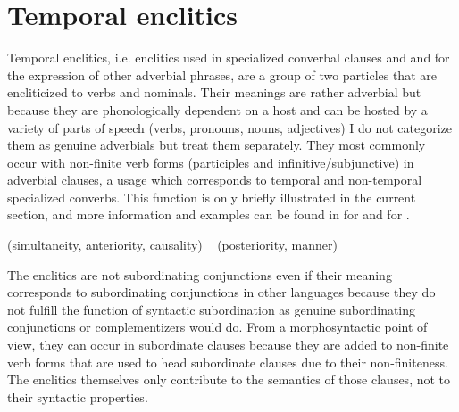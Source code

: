 \section{Temporal enclitics}
\label{sec:Temporal enclitics}

Temporal enclitics, i.e. enclitics used in specialized converbal clauses and and for the expression of other adverbial phrases, are a group of two particles that are encliticized to verbs and nominals. Their meanings are rather adverbial  but because they are phonologically dependent on a host and can be hosted by a variety of parts of speech (verbs, pronouns, nouns, adjectives) I do not categorize them as genuine adverbials but treat them separately. They most commonly occur with non-finite verb forms (participles and infinitive/subjunctive) in adverbial clauses, a usage which corresponds to temporal and non-temporal specialized converbs. This function is only briefly illustrated in the current section, and more information and examples can be found in  for  and  for . 


\begin{exe}
	\ex	\label{ex:subordinating enclitics}
	\begin{xlist}
		\TabPositions{14em}
		\ex	{} 	\tab	(simultaneity, anteriority, causality)	   
		\ex	{} 
		\sn	~\hspace*{1em}					\tab	(posteriority, manner)	      
	\end{xlist}
\end{exe}

The enclitics are not subordinating conjunctions even if their meaning corresponds to subordinating conjunctions in other languages because they do not fulfill the function of syntactic subordination as genuine subordinating conjunctions or complementizers would do. From a morphosyntactic point of view, they can occur in subordinate clauses because they are added to non-finite verb forms that are used to head subordinate clauses due to their non-finiteness. The enclitics themselves only contribute to the semantics of those clauses, not to their syntactic properties. 

